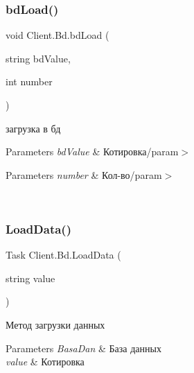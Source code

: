 \subsubsection{\texorpdfstring{bd\+Load()}{bdLoad()}}
{\footnotesize\ttfamily void Client.\+Bd.\+bd\+Load (\begin{DoxyParamCaption}\item[{string}]{bd\+Value,  }\item[{int}]{number }\end{DoxyParamCaption})\hspace{0.3cm}{\ttfamily [inline]}}



загрузка в бд 


\begin{DoxyParams}{Parameters}
{\em bd\+Value} & Котировка/param$>$ 
\begin{DoxyParams}{Parameters}
{\em number} & Кол-\/во/param$>$ \\
\hline
\end{DoxyParams}
\\
\hline
\end{DoxyParams}
\hypertarget{class_client_1_1_bd_a39c09d734ca537c31b51af1f0a3ef84c}{}\label{class_client_1_1_bd_a39c09d734ca537c31b51af1f0a3ef84c} 
\subsubsection{\texorpdfstring{Load\+Data()}{LoadData()}}
{\footnotesize\ttfamily Task Client.\+Bd.\+Load\+Data (\begin{DoxyParamCaption}\item[{string}]{value }\end{DoxyParamCaption})\hspace{0.3cm}{\ttfamily [inline]}}



Метод загрузки данных 


\begin{DoxyParams}{Parameters}
{\em Basa\+Dan} & База данных\\
\hline
{\em value} & Котировка\\
\hline
\end{DoxyParams}
\hypertarget{class_client_1_1_bd_a1127b7b1b53edf9e1b86c4292a1e91cd}{}\label{class_client_1_1_bd_a1127b7b1b53edf9e1b86c4292a1e91cd} 
